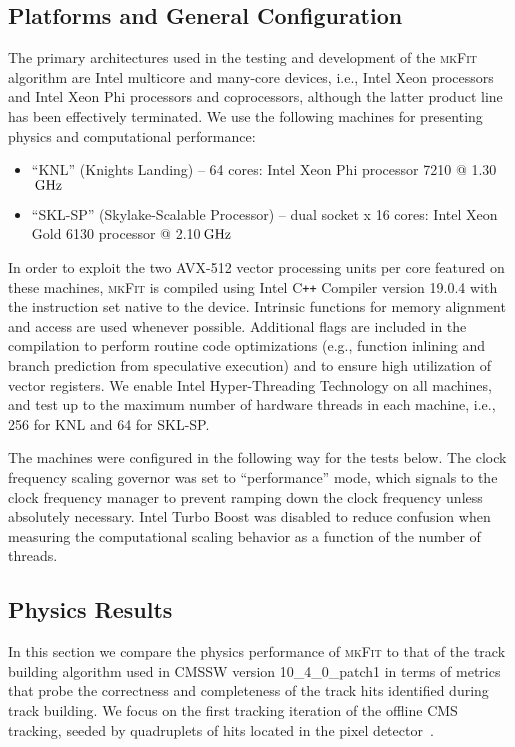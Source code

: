 \documentclass[a4paper,11pt]{article}
\newcommand{\mkFit}{\textsc{mkFit}\xspace}
\newcommand{\cpp}{C\texttt{++}\xspace}
\newcommand{\Intel}{Intel\textregistered\xspace}
\newcommand{\Xeon}{Xeon\textregistered\xspace}
\newcommand{\XeonPhi}{Xeon Phi\texttrademark\xspace}
\newcommand{\unit}[1]{\ensuremath{\text{\,#1}}\xspace}          \newcommand{\unitns}[1]{\ensuremath{\text{#1}}\xspace}
\begin{document}
\subsection{Platforms and General Configuration}

The primary architectures used in the testing and development of the \mkFit algorithm are \Intel multicore and many-core devices, i.e., \Intel \Xeon processors and \Intel \XeonPhi processors and coprocessors, although the latter product line has been effectively terminated. 
We use the following machines for presenting physics and
computational performance:
\begin{itemize}
    \item ``KNL'' (Knights Landing) -- 64 cores: \Intel \XeonPhi processor 7210 {@} 1.30\unit{GHz}
    \item ``SKL-SP'' (Skylake-Scalable Processor) -- dual socket x 16 cores: \Intel \Xeon Gold 6130 processor {@} 2.10\unit{GHz}
\end{itemize}

In order to exploit the two AVX-512 vector processing units per core featured on these machines, \mkFit is compiled using \Intel \cpp Compiler version 19.0.4 with the instruction set native to the device. 
Intrinsic functions for memory alignment and access are used whenever possible. Additional flags are included in the compilation to perform routine code optimizations (e.g., function inlining and branch prediction from speculative execution) and to ensure high utilization of vector registers. We enable \Intel Hyper-Threading Technology on all machines, and test up to the maximum number of hardware threads in each machine, i.e., 256 for KNL and 64 for SKL-SP.

The machines were configured in the following way for the tests below. The clock frequency scaling governor was set to ``performance'' mode, which signals to the clock frequency manager to prevent ramping down the clock frequency unless absolutely necessary. \Intel Turbo Boost was disabled to reduce confusion when measuring the computational scaling behavior as a function of the number of threads. 

\subsection{Physics Results}
\label{physics}

In this section we compare the physics performance of \mkFit to that of the track building algorithm used in CMSSW version 10\_4\_0\_patch1 in terms of metrics that probe the correctness and completeness of the track hits identified during track building. We focus on the first tracking iteration of the offline CMS tracking, seeded by quadruplets of hits located in the pixel detector~\cite{Pantaleo:2293435}.
\end{document}

